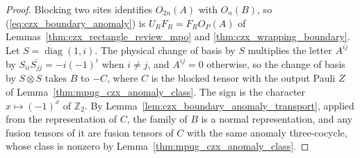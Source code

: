 \begin{proof}\leanok
    Blocking two sites identifies $O_{2n}(A)$ with $O_n(B)$, so
    (\ref{eq:czx_boundary_anomaly}) is $U_RF_R=F_RO_P(A)$ of
    Lemmas~\ref{thm:czx_rectangle_review_mpo} and
    \ref{thm:czx_wrapping_boundary}. Let $S=\operatorname{diag}(1,i)$.
    The physical change of basis by $S$ multiplies the letter $A^{ij}$ by
    $S_{ii}\overline{S_{jj}}=-i(-1)^i$ when $i\neq j$, and $A^{ij}=0$
    otherwise, so the change of basis by $S\otimes S$ takes $B$ to $-C$, where
    $C$ is the blocked tensor with the output Pauli $Z$ of
    Lemma~\ref{thm:mpug_czx_anomaly_class}. The sign is the character
    $x\mapsto(-1)^x$ of $\mathbb Z_2$. By
    Lemma~\ref{lem:czx_boundary_anomaly_transport}, applied from the
    representation of $C$, the family of $B$ is a normal representation, and
    any fusion tensors of it are fusion tensors of $C$ with the same anomaly
    three-cocycle, whose class is nonzero by
    Lemma~\ref{thm:mpug_czx_anomaly_class}.
\end{proof}
